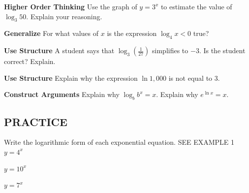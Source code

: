 \documentclass{article}
\newenvironment{practice}[2]{}{}
\begin{document}
\begin{practice}{15}{?}
\textbf{Higher Order Thinking} Use the graph of $y = 3^x$ to estimate the value of $\log_3 50$. Explain your reasoning.

\end{practice}

\begin{practice}{16}{?}
\textbf{Generalize} For what values of $x$ is the expression $\log_4 x < 0$ true?
\end{practice}

\begin{practice}{17}{?}
\textbf{Use Structure} A student says that $\log_3\left(\frac{1}{27}\right)$ simplifies to $-3$. Is the student correct? Explain.
\end{practice}

\begin{practice}{18}{?}
\textbf{Use Structure} Explain why the expression $\ln 1,000$ is not equal to 3.
\end{practice}

\begin{practice}{19}{?}
\textbf{Construct Arguments} Explain why $\log_b b^x = x$. Explain why $e^{\ln x} = x$.
\end{practice}

\subsection*{PRACTICE}

Write the logarithmic form of each exponential equation. SEE EXAMPLE 1
\begin{practice}{20}{?}
$y = 4^x$
\end{practice}

\begin{practice}{21}{?}
$y = 10^x$
\end{practice}

\begin{practice}{22}{?}
$y = 7^x$
\end{practice}
\end{document}
